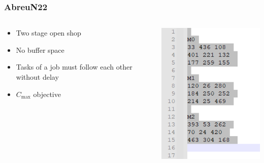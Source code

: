 \documentclass[dvipsnames,aspectratio=169]{beamer}
\begin{document}
\begin{frame}
\frametitle{AbreuN22 \cite{AbreuN22}}
\begin{columns}
\begin{column}{0.5\textwidth}
\begin{itemize}
\item Two stage open shop
\item No buffer space
\item Tasks of a job must follow each other without delay
\item $C_{\max}$ objective
\end{itemize}
\end{column}
\begin{column}{0.5\textwidth}
\includegraphics[width=.5\textwidth]{images/AbreuN22}
\end{column}
\end{columns}
\end{frame}
\end{document}
